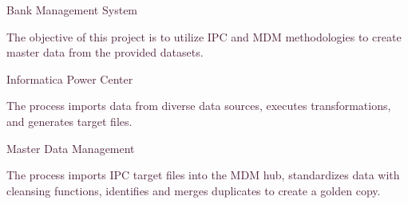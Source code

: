 \documentclass[12pt]{article}
\begin{document}
\begin{justify}
\textcolor[HTML]{481A34}{Bank} \textcolor[HTML]{481A34}{ } \textcolor[HTML]{481A34}{Management} \textcolor[HTML]{481A34}{ } \textcolor[HTML]{481A34}{System}
\end{justify}
\begin{justify}
\textcolor[HTML]{481A34}{The objective of this project is to utilize IPC and} \textcolor[HTML]{481A34}{ } \textcolor[HTML]{481A34}{MDM} \textcolor[HTML]{481A34}{ } \textcolor[HTML]{481A34}{methodologies} \textcolor[HTML]{481A34}{ } \textcolor[HTML]{481A34}{to} \textcolor[HTML]{481A34}{ } \textcolor[HTML]{481A34}{create} \textcolor[HTML]{481A34}{ } \textcolor[HTML]{481A34}{master} \textcolor[HTML]{481A34}{ } \textcolor[HTML]{481A34}{data} \textcolor[HTML]{481A34}{ } \textcolor[HTML]{481A34}{from} \textcolor[HTML]{481A34}{ } \textcolor[HTML]{481A34}{the} \textcolor[HTML]{481A34}{ } \textcolor[HTML]{481A34}{provided} \textcolor[HTML]{481A34}{ } \textcolor[HTML]{481A34}{datasets.}
\end{justify}
\begin{flushleft}
\textcolor[HTML]{481A34}{Informatica} \textcolor[HTML]{481A34}{ } \textcolor[HTML]{481A34}{Power} \textcolor[HTML]{481A34}{ } \textcolor[HTML]{481A34}{Center}
\end{flushleft}
\begin{justify}
\textcolor[HTML]{481A34}{The} \textcolor[HTML]{481A34}{ } \textcolor[HTML]{481A34}{process} \textcolor[HTML]{481A34}{ } \textcolor[HTML]{481A34}{imports} \textcolor[HTML]{481A34}{ } \textcolor[HTML]{481A34}{data} \textcolor[HTML]{481A34}{ } \textcolor[HTML]{481A34}{from} \textcolor[HTML]{481A34}{ } \textcolor[HTML]{481A34}{diverse} \textcolor[HTML]{481A34}{ } \textcolor[HTML]{481A34}{data} \textcolor[HTML]{481A34}{ } \textcolor[HTML]{481A34}{sources, executes transformations, and} \textcolor[HTML]{481A34}{ } \textcolor[HTML]{481A34}{generates} \textcolor[HTML]{481A34}{ } \textcolor[HTML]{481A34}{target} \textcolor[HTML]{481A34}{ } \textcolor[HTML]{481A34}{files.}
\end{justify}
\begin{flushleft}
\textcolor[HTML]{481A34}{Master} \textcolor[HTML]{481A34}{ } \textcolor[HTML]{481A34}{Data} \textcolor[HTML]{481A34}{ } \textcolor[HTML]{481A34}{Management}
\end{flushleft}
\begin{justify}
\textcolor[HTML]{481A34}{The process imports IPC target files into the} \textcolor[HTML]{481A34}{ } \textcolor[HTML]{481A34}{MDM hub, } \textcolor[HTML]{481A34}{standardizes data with cleansing} \textcolor[HTML]{481A34}{ } \textcolor[HTML]{481A34}{functions, identifies} \textcolor[HTML]{481A34}{ } \textcolor[HTML]{481A34}{and} \textcolor[HTML]{481A34}{ } \textcolor[HTML]{481A34}{merges} \textcolor[HTML]{481A34}{ } \textcolor[HTML]{481A34}{duplicates to} \textcolor[HTML]{481A34}{ } \textcolor[HTML]{481A34}{create} \textcolor[HTML]{481A34}{ } \textcolor[HTML]{481A34}{a} \textcolor[HTML]{481A34}{ } \textcolor[HTML]{481A34}{golden} \textcolor[HTML]{481A34}{ } \textcolor[HTML]{481A34}{copy.}
\end{justify}
\end{document}
